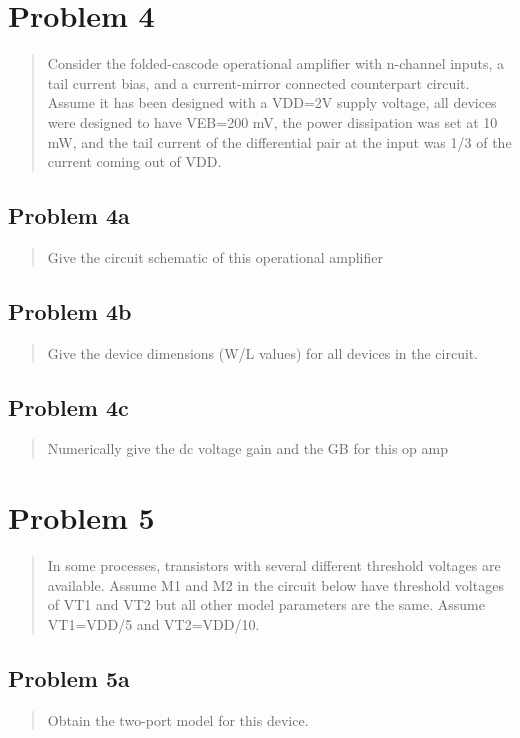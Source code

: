 \documentclass[10pt,a4paper]{article}
\let\oldsubsection\subsection
\renewcommand{\subsection}{%
    \setcounter{equation}{0}%
    \oldsubsection%
}
\begin{document}
\section{Problem 4}
\begin{quote}
Consider the folded-cascode operational amplifier with n-channel inputs, a
tail current bias, and a current-mirror connected counterpart circuit. Assume it has been
designed with a VDD=2V supply voltage, all devices were designed to have VEB=200 mV,
the power dissipation was set at 10 mW, and the tail current of the differential pair at the
input was 1/3 of the current coming out of VDD.
\end{quote}


\subsection{Problem 4a}
\begin{quote}
Give the circuit schematic of this operational amplifier
\end{quote}


\subsection{Problem 4b}
\begin{quote}
Give the device dimensions (W/L values) for all devices in the circuit.
\end{quote}


\subsection{Problem 4c}
\begin{quote}
Numerically give the dc voltage gain and the GB for this op amp
\end{quote}



\section{Problem 5}
\begin{quote}
In some processes, transistors with several different threshold voltages are
available. Assume M1 and M2 in the circuit below have threshold voltages of VT1 and
VT2 but all other model parameters are the same. Assume VT1=VDD/5 and VT2=VDD/10.
\end{quote}

\subsection{Problem 5a}
\begin{quote}
Obtain the two-port model for this device.
\end{quote}
\end{document}
